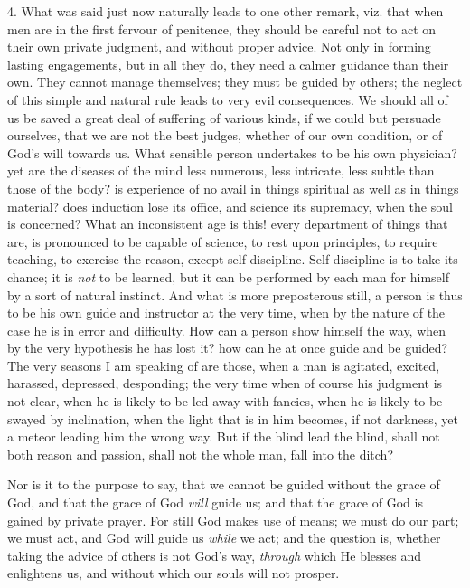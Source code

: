 4. What was said just now naturally leads to one other remark, viz.
that when men are in the first fervour of penitence, they should be
careful not to act on their own private judgment, and without proper
advice. Not only in forming lasting engagements, but in all they do,
they need a calmer guidance than their own. They cannot manage
themselves; they must be guided by others; the neglect of this simple
and natural rule leads to very evil consequences. We should all of us
be saved a great deal of suffering of various kinds, if we could but
persuade ourselves, that we are not the best judges, whether of our
own condition, or of God's will towards us. What sensible person
undertakes to be his own physician? yet are the diseases of the mind
less numerous, less intricate, less subtle than those of the body? is
experience of no avail in things spiritual as well as in things
material? does induction lose its office, and science its supremacy,
when the soul is concerned? What an inconsistent age is this! every
department of things that are, is pronounced to be capable of science,
to rest upon principles, to require teaching, to exercise the reason,
except self-discipline. Self-discipline is to take its chance; it is \emph{not}
to be learned, but it can be performed by each man for himself by a
sort of natural instinct. And what is more preposterous still, a
person is thus to be his own guide and instructor at the very time,
when by the nature of the case he is in error and difficulty. How can
a person show himself the way, when by the very hypothesis he has lost
it? how can he at once guide and be guided? The very seasons I am
speaking of are those, when a man is agitated, excited, harassed,
depressed, desponding; the very time when of course his judgment is
not clear, when he is likely to be led away with fancies, when he is
likely to be swayed by inclination, when the light that is in him
becomes, if not darkness, yet a meteor leading him the wrong way. But
if the blind lead the blind, shall not both reason and passion, shall
not the whole man, fall into the ditch?

Nor is it to the purpose to say, that we cannot be guided without
the grace of God, and that the grace of God \emph{will} guide us; and that
the grace of God is gained by private prayer. For still God makes use
of means; we must do our part; we must act, and God will guide us \emph{while}
we act; and the question is, whether taking the advice of others is
not God's way, \emph{through} which He blesses and enlightens us, and
without which our souls will not prosper.

